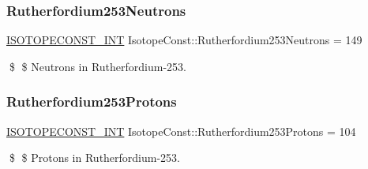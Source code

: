 \subsubsection{\texorpdfstring{Rutherfordium253\+Neutrons}{Rutherfordium253Neutrons}}
{\footnotesize\ttfamily \mbox{\hyperlink{group___isotope_const-_macros_ga5f18360b3e99483a35c32d789e62621c}{I\+S\+O\+T\+O\+P\+E\+C\+O\+N\+S\+T\+\_\+\+I\+NT}} Isotope\+Const\+::\+Rutherfordium253\+Neutrons = 149}

\$ \$ Neutrons in Rutherfordium-\/253. \mbox{\label{group___isotope_const-_rutherfordium-_rf253_gafb570610998425a135be74d7b99863c2}} 
\subsubsection{\texorpdfstring{Rutherfordium253\+Protons}{Rutherfordium253Protons}}
{\footnotesize\ttfamily \mbox{\hyperlink{group___isotope_const-_macros_ga5f18360b3e99483a35c32d789e62621c}{I\+S\+O\+T\+O\+P\+E\+C\+O\+N\+S\+T\+\_\+\+I\+NT}} Isotope\+Const\+::\+Rutherfordium253\+Protons = 104}

\$ \$ Protons in Rutherfordium-\/253. 